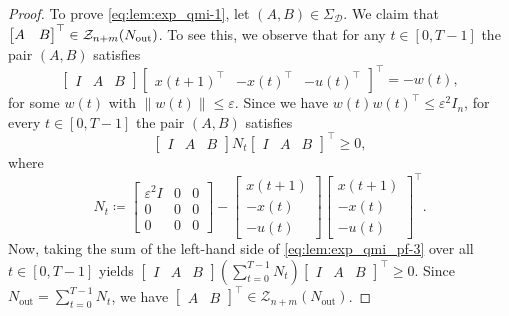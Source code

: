 \documentclass[journal,twoside,web]{ieeecolor}
\newcommand{\norm}[1]{\left\|#1\right\|}
\begin{document}
\begin{proof}
To prove \eqref{eq:lem:exp_qmi-1}, let $(A,B)\in\Sigma_\mathcal{D}$. We claim that $\begin{bmatrix}
A & B
\end{bmatrix}^\top\in\mathcal{Z}_{n+m}(N_\textup{out})$. To see this, we observe that for any $t\in[0,T-1]$ the pair $(A,B)$ satisfies
\begin{equation}
\label{eq:lem:exp_qmi_pf-1}
\begin{bmatrix}
I & A & B
\end{bmatrix}\begin{bmatrix}
x(t+1)^\top &
-x(t)^\top &
-u(t)^\top
\end{bmatrix}^\top=-w(t),
\end{equation}
for some $w(t)$ with $\norm{w(t)}\leq\varepsilon$. Since we have \mbox{$w(t)w(t)^\top \leq \varepsilon^2 I_n$}, for every $t\in[0,T-1]$ the pair $(A,B)$ satisfies
\begin{equation}
\label{eq:lem:exp_qmi_pf-3}
\begin{bmatrix}
I & A & B
\end{bmatrix} N_t\begin{bmatrix}
I & A & B
\end{bmatrix}^\top\geq 0,
\end{equation}
where 
\begin{equation}
N_t\coloneqq\begin{bmatrix}
\varepsilon^2 I & 0 & 0 \\
0 & 0 & 0 \\
0 & 0 & 0
\end{bmatrix}-\begin{bmatrix}
x(t+1) \\
-x(t) \\
-u(t)
\end{bmatrix}\begin{bmatrix}
x(t+1) \\
-x(t) \\
-u(t)
\end{bmatrix}^\top.
\end{equation}
Now, taking the sum of the left-hand side of \eqref{eq:lem:exp_qmi_pf-3} over all \mbox{$t\in[0,T-1]$} yields \mbox{$\begin{bmatrix}
I \!&\! A \!&\! B
\end{bmatrix}(\textstyle{\sum_{t=0}^{T-1}N_t})\begin{bmatrix}
I \!&\! A \!&\! B
\end{bmatrix}^\top\!\geq\! 0$}. Since $N_\text{out}\!=\!\sum_{t=0}^{T-1} N_t$, we have \mbox{$\begin{bmatrix}
A \!&\! B
\end{bmatrix}^\top\!\in\!\mathcal{Z}_{n+m}(N_\text{out})$}. 
\end{proof}
\end{document}
